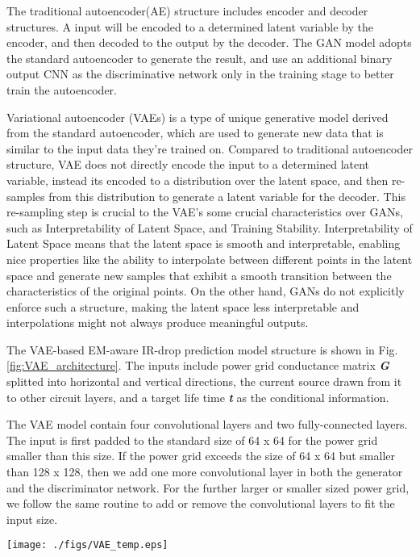 The traditional autoencoder(AE) structure includes encoder and decoder structures. A input will be encoded to a determined latent variable by the encoder, and then decoded to the output by the decoder.  The GAN model adopts the standard autoencoder to generate the result, and use an additional binary output CNN as the discriminative network only in the training stage to better train the autoencoder. 
 
Variational autoencoder (VAEs) is a type of unique generative model derived from the standard autoencoder, which are used to generate new data that is similar to the input data they're trained on. 
Compared to traditional autoencoder structure, VAE does not directly encode the input to a determined latent variable, instead its encoded to a distribution over the latent space,  and then re-samples from this distribution to generate a latent variable for the decoder. This re-sampling step is crucial to the VAE's some crucial characteristics over GANs, such as Interpretability of Latent Space, and Training Stability.
Interpretability of Latent Space means that the latent space is smooth and interpretable, enabling nice properties like the ability to interpolate between different points in the latent space and generate new samples that exhibit a smooth transition between the characteristics of the original points. On the other hand, GANs do not explicitly enforce such a structure, making the latent space less interpretable and interpolations might not always produce meaningful outputs. 

The VAE-based EM-aware IR-drop prediction model structure is shown in Fig.\ref{fig:VAE_architecture}. The inputs include power grid conductance matrix \textit{\textbf{G}} splitted into horizontal and vertical directions, the current source drawn from it to other circuit layers, and a target life time \textit{\textbf{t}} as the conditional information. 
 
The VAE model contain four convolutional layers and two fully-connected layers. The input is first padded to the standard size of 64 x 64 for the power grid smaller than this size. If the power grid exceeds the size of 64 x 64 but smaller than 128 x 128, then we add one more convolutional layer in both the generator and the discriminator network. For the further larger or smaller sized power grid, we follow the same routine to add or remove the convolutional layers to fit the input size.
\begin{figure*}[h!]
	\centering
	\texttt{[image: ./figs/VAE\_temp.eps]}
	\caption{The VAE model structure in our method} 
	\label{fig:VAE_architecture}
\end{figure*}

